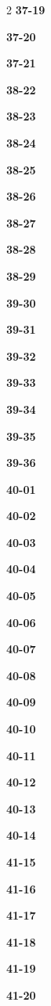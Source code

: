 \documentclass[10pt,a4paper]{article}
\begin{document}
\begin{multicols}{2}
\noindent\textbf{37-19}\ \par
\noindent\textbf{37-20}\ \par
\noindent\textbf{37-21}\ \par
\noindent\textbf{38-22}\ \par
\noindent\textbf{38-23}\ \par
\noindent\textbf{38-24}\ \par
\noindent\textbf{38-25}\ \par
\noindent\textbf{38-26}\ \par
\noindent\textbf{38-27}\ \par
\noindent\textbf{38-28}\ \par
\noindent\textbf{38-29}\ \par
\noindent\textbf{39-30}\ \par
\noindent\textbf{39-31}\ \par
\noindent\textbf{39-32}\ \par
\noindent\textbf{39-33}\ \par
\noindent\textbf{39-34}\ \par
\noindent\textbf{39-35}\ \par
\noindent\textbf{39-36}\ \par
\noindent\textbf{40-01}\ \par
\noindent\textbf{40-02}\ \par
\noindent\textbf{40-03}\ \par
\noindent\textbf{40-04}\ \par
\noindent\textbf{40-05}\ \par
\noindent\textbf{40-06}\ \par
\noindent\textbf{40-07}\ \par
\noindent\textbf{40-08}\ \par
\noindent\textbf{40-09}\ \par
\noindent\textbf{40-10}\ \par
\noindent\textbf{40-11}\ \par
\noindent\textbf{40-12}\ \par
\noindent\textbf{40-13}\ \par
\noindent\textbf{40-14}\ \par
\noindent\textbf{41-15}\ \par
\noindent\textbf{41-16}\ \par
\noindent\textbf{41-17}\ \par
\noindent\textbf{41-18}\ \par
\noindent\textbf{41-19}\ \par
\noindent\textbf{41-20}\ \par

\end{multicols}
\end{document}
